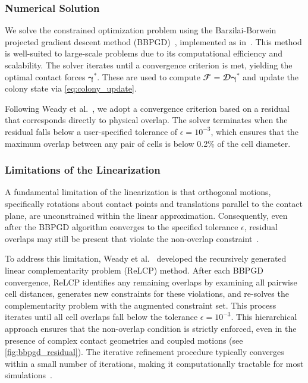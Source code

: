 \documentclass[conference]{IEEEtran}
\begin{document}
\subsubsection{Numerical Solution}

We solve the constrained optimization problem using the Barzilai-Borwein projected gradient descent method (BBPGD)~\cite{BBPGD}, implemented as in~\cite{Weady2024SM,Yan2019}. This method is well-suited to large-scale problems due to its computational efficiency and scalability. The solver iterates until a convergence criterion is met, yielding the optimal contact forces $\boldsymbol{\gamma}^*$. These are used to compute $\mathbfcal{F} = \mathbfcal{D}\boldsymbol{\gamma}^*$ and update the colony state via \autoref{eq:colony_update}.

Following Weady et al.~\cite{Weady2024SM}, we adopt a convergence criterion based on a residual that corresponds directly to physical overlap. The solver terminates when the residual falls below a user-specified tolerance of $\epsilon = 10^{-3}$, which ensures that the maximum overlap between any pair of cells is below 0.2\% of the cell diameter.

\subsubsection{Limitations of the Linearization}

A fundamental limitation of the linearization is that orthogonal motions, specifically rotations about contact points and translations parallel to the contact plane, are unconstrained within the linear approximation. Consequently, even after the BBPGD algorithm converges to the specified tolerance $\epsilon$, residual overlaps may still be present that violate the non-overlap constraint~\cite{Weady2024SM}.

To address this limitation, Weady et al.~\cite{Weady2024SM} developed the recursively generated linear complementarity problem (ReLCP) method. After each BBPGD convergence, ReLCP identifies any remaining overlaps by examining all pairwise cell distances, generates new constraints for these violations, and re-solves the complementarity problem with the augmented constraint set. This process iterates until all cell overlaps fall below the tolerance $\epsilon = 10^{-3}$. This hierarchical approach ensures that the non-overlap condition is strictly enforced, even in the presence of complex contact geometries and coupled motions (see \autoref{fig:bbpgd_residual}). The iterative refinement procedure typically converges within a small number of iterations, making it computationally tractable for most simulations~\cite{Weady2024SM}.
\end{document}
